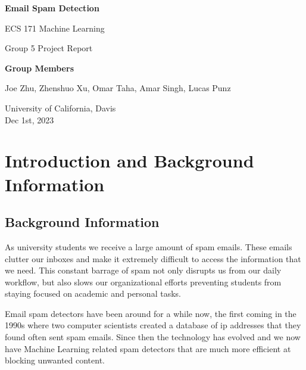 \documentclass[10pt]{article}
\begin{document}
\begin{titlepage}
    \begin{center}
        \vspace*{1cm}
 
        \textbf{Email Spam Detection}
 
        \vspace{0.5cm}
        ECS 171 Machine Learning

        Group 5 Project Report
             
        \vspace{1.5cm}
 
        \textbf{Group Members}

        Joe Zhu, Zhenshuo Xu, Omar Taha, Amar Singh, Lucas Punz
 
        \vfill
             
        University of California, Davis\\
        Dec 1st, 2023
    \end{center}
\end{titlepage}

\newpage
\section*{Introduction and Background Information}

\subsection{Background Information}
As university students we receive a large amount of spam emails. These emails clutter our inboxes and make it extremely difficult to access the information that we need. This constant barrage of spam not only disrupts us from our daily workflow, but also slows our organizational efforts preventing students from staying focused on academic and personal tasks. 

Email spam detectors have been around for a while now, the first coming in the 1990s where two computer scientists created a database of ip addresses that they found often sent spam emails. Since then the technology has evolved and we now have Machine Learning related spam detectors that are much more efficient at blocking unwanted content. 
\end{document}
